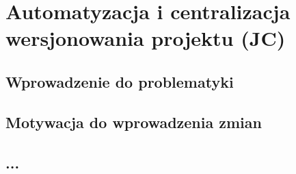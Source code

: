 \clearpage
\section{Automatyzacja i centralizacja wersjonowania projektu (JC)}
\label{ch:versioning}

\subsection{Wprowadzenie do problematyki}

\subsection{Motywacja do wprowadzenia zmian}

\subsection{...}